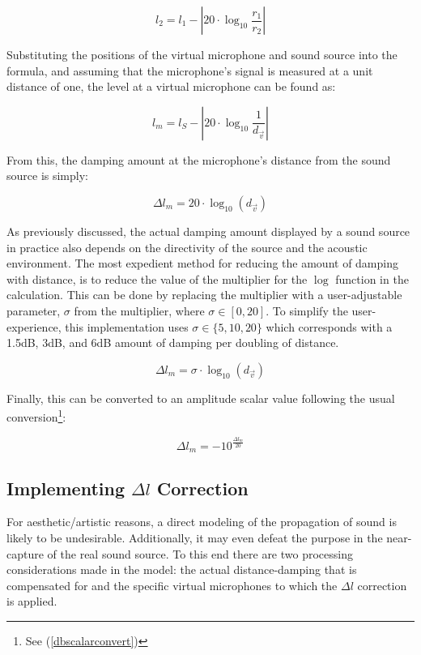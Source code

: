 \begin{equation}
l_2 = l_1 - \left|20 \cdot \log_{10}\frac{r_1}{r_2}\right|
\end{equation}

Substituting the positions of the virtual microphone and sound source into the formula, and assuming that the microphone's signal is measured at a unit distance of one, the level at a virtual microphone can be found as:

\begin{equation}
l_m = l_S - \left|20 \cdot \log_{10}\frac{1}{d_{\vec{v}}}\right|
\end{equation}

From this, the damping amount at the microphone's distance from the sound source is simply:

\begin{equation}
\Delta{l}_m = 20 \cdot\log_{10}(d_{\vec{v}})
\end{equation}

As previously discussed, the actual damping amount displayed by a sound source in practice also depends on the directivity of the source and the acoustic environment. The most expedient method for reducing the amount of damping with distance, is to reduce the value of the multiplier for the $\log$ function in the calculation. This can be done by replacing the multiplier with a user-adjustable parameter, $\sigma$ from the multiplier, where $\sigma \in [0,20]$. To simplify the user-experience, this implementation uses $\sigma \in \{5, 10, 20\}$ which corresponds with a 1.5dB, 3dB, and 6dB amount of damping per doubling of distance.

\begin{equation}\label{distancedamping}
\Delta{l}_m = \sigma\cdot\log_{10}(d_{\vec{v}})
\end{equation}

Finally, this can be converted to an amplitude scalar value following the usual conversion\footnote{See (\ref{dbscalarconvert})}:

\begin{equation}
\Delta{l}_m= -10^{\frac{\Delta{l}_m}{20}}
\end{equation}

\subsection{Implementing $\Delta{l}$ Correction}

For aesthetic/artistic reasons, a direct modeling of the propagation of sound is likely to be undesirable. Additionally, it may even defeat the purpose in the near-capture of the real sound source. To this end there are two processing considerations made in the model: the actual distance-damping that is compensated for and the specific virtual microphones to which the $\Delta{l}$ correction is applied.

